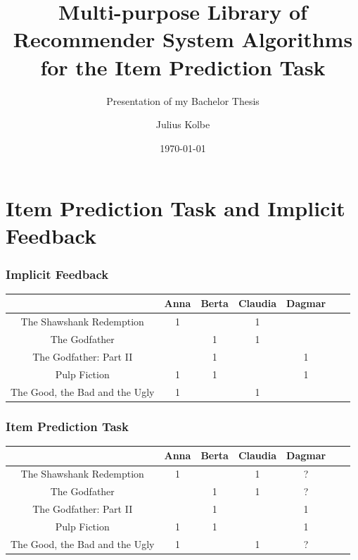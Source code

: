 \documentclass[mathserif,svgnames]{beamer}
\title[Library of Recommender System Algorithms]
{Multi-purpose Library of Recommender System Algorithms for the Item Prediction Task}
\subtitle{Presentation of my Bachelor Thesis}
\author{Julius Kolbe}
\date{\today}
\institute{\large{L3S Research Center / Leibniz University of Hanover\\ Hannover, Germany}}
\begin{document}
\frame{\titlepage} %

\section{Item Prediction Task and Implicit Feedback}
\begin{frame}
\frametitle{Implicit Feedback}

\begin{table}[t]
\begin{tabular}{c|cccccc}
    &Anna&Berta&Claudia&Dagmar\\\hline
    The Shawshank Redemption&1&&1&\\
    The Godfather&&1&1&\\
    The Godfather: Part II&&1&&1\\
    Pulp Fiction&1&1&&1\\
    The Good, the Bad and the Ugly&1&&1&\\
\end{tabular}
\end{table}
\end{frame}
\begin{frame}
\frametitle{Item Prediction Task}

\begin{table}[t]
\begin{tabular}{c|cccccc}
    &Anna&Berta&Claudia&Dagmar\\\hline
    The Shawshank Redemption&1&&1&?\\
    The Godfather&&1&1&?\\
    The Godfather: Part II&&1&&1\\
    Pulp Fiction&1&1&&1\\
    The Good, the Bad and the Ugly&1&&1&?\\
\end{tabular}
\end{table}

\end{frame}
\end{document}
